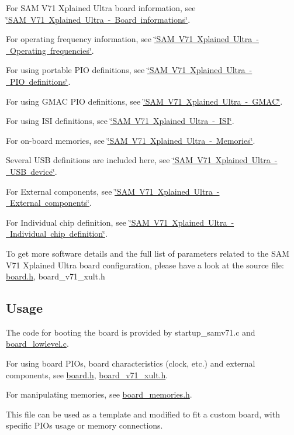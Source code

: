 \begin{DoxyItemize}
\item For S\+AM V71 Xplained Ultra board information, see \mbox{\hyperlink{samv7_Xplained_ultra_board_info}{\char`\"{}\+S\+A\+M V71 Xplained Ultra -\/ Board informations\char`\"{}}}.
\item For operating frequency information, see \mbox{\hyperlink{samv7_Xplained_ultra_opfreq}{\char`\"{}\+S\+A\+M V71 Xplained Ultra -\/ Operating frequencies\char`\"{}}}.
\item For using portable P\+IO definitions, see \mbox{\hyperlink{samv7_Xplained_ultra_piodef}{\char`\"{}\+S\+A\+M V71 Xplained Ultra -\/ P\+I\+O definitions\char`\"{}}}.
\item For using G\+M\+AC P\+IO definitions, see \mbox{\hyperlink{samv7_Xplained_ultra_gmac}{\char`\"{}\+S\+A\+M V71 Xplained Ultra -\/ G\+M\+A\+C\char`\"{}}}.
\item For using I\+SI definitions, see \mbox{\hyperlink{samv7_Xplained_ultra_isi}{\char`\"{}\+S\+A\+M V71 Xplained Ultra -\/ I\+S\+I\char`\"{}}}.
\item For on-\/board memories, see \mbox{\hyperlink{samv7_Xplained_ultra_mem}{\char`\"{}\+S\+A\+M V71 Xplained Ultra -\/ Memories\char`\"{}}}.
\item Several U\+SB definitions are included here, see \mbox{\hyperlink{samv7_Xplained_ultra_usb}{\char`\"{}\+S\+A\+M V71 Xplained Ultra -\/ U\+S\+B device\char`\"{}}}.
\item For External components, see \mbox{\hyperlink{samv7_Xplained_ultra_extcomp}{\char`\"{}\+S\+A\+M V71 Xplained Ultra -\/ External components\char`\"{}}}.
\item For Individual chip definition, see \mbox{\hyperlink{samv7_Xplained_ultra_chipdef}{\char`\"{}\+S\+A\+M V71 Xplained Ultra -\/ Individual chip definition\char`\"{}}}.
\end{DoxyItemize}

To get more software details and the full list of parameters related to the S\+AM V71 Xplained Ultra board configuration, please have a look at the source file\+: \mbox{\hyperlink{board_8h}{board.\+h}}, board\+\_\+v71\+\_\+xult.\+h~\newline
\hypertarget{group__RTEMSBSPsARM_Usage}{}\subsection{Usage}\label{group__RTEMSBSPsARM_Usage}

\begin{DoxyItemize}
\item The code for booting the board is provided by startup\+\_\+samv71.\+c and \mbox{\hyperlink{board__lowlevel_8c}{board\+\_\+lowlevel.\+c}}.
\item For using board P\+I\+Os, board characteristics (clock, etc.) and external components, see \mbox{\hyperlink{board_8h}{board.\+h}}, \mbox{\hyperlink{board__v71__xult_8h_source}{board\+\_\+v71\+\_\+xult.\+h}}.
\item For manipulating memories, see \mbox{\hyperlink{board__memories_8h}{board\+\_\+memories.\+h}}.
\end{DoxyItemize}

This file can be used as a template and modified to fit a custom board, with specific P\+I\+Os usage or memory connections. 